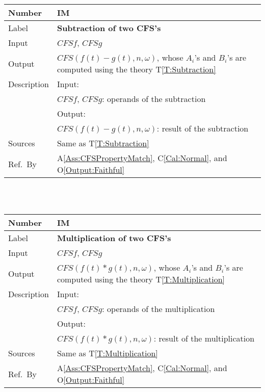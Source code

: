 \documentclass[12pt]{article}
\newcommand{\colAwidth}{0.13\textwidth}
\newcommand{\colBwidth}{0.82\textwidth}
\newcommand{\tref}[1]{T\ref{#1}}
\newcommand{\aref}[1]{A\ref{#1}}
\newcommand{\calref}[1]{C\ref{#1}}
\newcommand{\oref}[1]{O\ref{#1}}
\newcounter{instnum} %
\begin{document}
\noindent
\begin{minipage}{\textwidth}
	\renewcommand*{\arraystretch}{1.5}
	\begin{tabular}{| p{\colAwidth} | p{\colBwidth}|}
		\hline
		\rowcolor[gray]{0.9}
		Number& IM{instnum}\theinstnum 
		\label{IM:Subtraction}\\
		\hline
		Label& \bf Subtraction of two CFS's \\
		\hline
		Input& $\mathit{CFSf}$, $\mathit{CFSg}$\\
		\hline
		Output& $\mathit{CFS}(f(t)-g(t), n, \omega)$, whose $A_i$'s 
		and $B_i$'s are computed using the theory \tref{T:Subtraction}\\
		\hline
		Description&Input:\\
		&$\mathit{CFSf}$, $\mathit{CFSg}$: operands of the subtraction\\
		&Output:\\
		& $\mathit{CFS}(f(t)-g(t), n, \omega)$: result of the subtraction\\
		\hline
		Sources&Same as \tref{T:Subtraction}		\\
		\hline
		Ref.\ By & \aref{Ass:CFSPropertyMatch}, \calref{Cal:Normal}, 
		and \oref{Output:Faithful}\\
		\hline
	\end{tabular}
\end{minipage}\\
~\newline

\noindent
\begin{minipage}{\textwidth}
	\renewcommand*{\arraystretch}{1.5}
	\begin{tabular}{| p{\colAwidth} | p{\colBwidth}|}
		\hline
		\rowcolor[gray]{0.9}
		Number& IM{instnum}\theinstnum 
		\label{IM:Multiplication}\\
		\hline
		Label& \bf Multiplication of two CFS's \\
		\hline
		Input& $\mathit{CFSf}$, $\mathit{CFSg}$\\
		\hline
		Output& $\mathit{CFS}(f(t)*g(t), n, \omega)$, whose $A_i$'s 
		and $B_i$'s are computed using the theory 
		\tref{T:Multiplication}\\
		\hline
		Description&Input:\\
		&$\mathit{CFSf}$, $\mathit{CFSg}$: operands of the 
		multiplication\\
		&Output:\\
		& $\mathit{CFS}(f(t)*g(t), n, \omega)$: result 
		of the multiplication\\
		\hline
		Sources&Same as \tref{T:Multiplication}\\
		\hline
		Ref.\ By & \aref{Ass:CFSPropertyMatch}, \calref{Cal:Normal}, 
		and \oref{Output:Faithful}\\
		\hline
	\end{tabular}
\end{minipage}\\
~\newline
\end{document}
